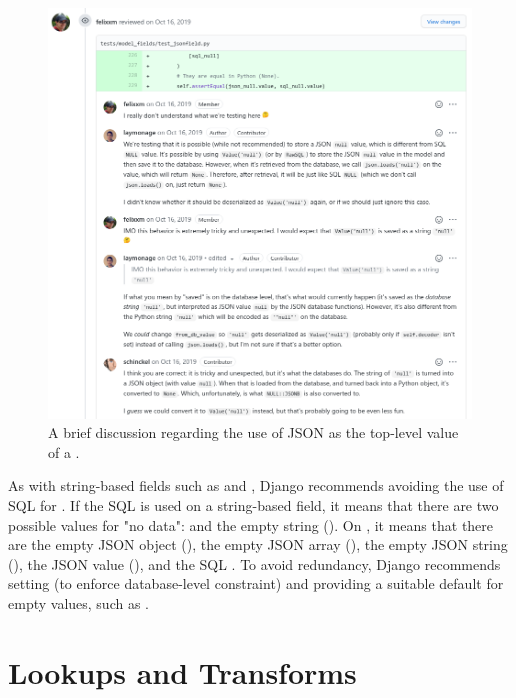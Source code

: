 \begin{figure}
	\centering
    \includegraphics[width=1.0\textwidth]{pics/null_discussion.png}
	\caption{A brief discussion regarding the use of JSON  as the
	top-level value of a .}
	\label{fig:nulldiscussion}
\end{figure}

As with string-based fields such as  and ,
Django recommends avoiding the use of SQL  for . If
the SQL  is used on a string-based field, it means that there are
two possible values for "no data":  and the empty string
(). On , it means that there are the empty JSON object
(), the empty JSON array (), the empty JSON string
(), the JSON  value (), and the SQL
. To avoid redundancy, Django recommends setting 
(to enforce database-level  constraint) and providing a suitable
default for empty values, such as .

\section{ Lookups and Transforms}

